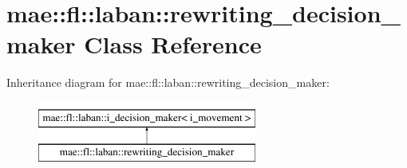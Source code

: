 \hypertarget{classmae_1_1fl_1_1laban_1_1rewriting__decision__maker}{\section{mae\-:\-:fl\-:\-:laban\-:\-:rewriting\-\_\-decision\-\_\-maker Class Reference}
\label{classmae_1_1fl_1_1laban_1_1rewriting__decision__maker}
}
Inheritance diagram for mae\-:\-:fl\-:\-:laban\-:\-:rewriting\-\_\-decision\-\_\-maker\-:\begin{figure}[H]
\begin{center}
\leavevmode
\includegraphics[height=2.000000cm]{classmae_1_1fl_1_1laban_1_1rewriting__decision__maker}
\end{center}
\end{figure}
